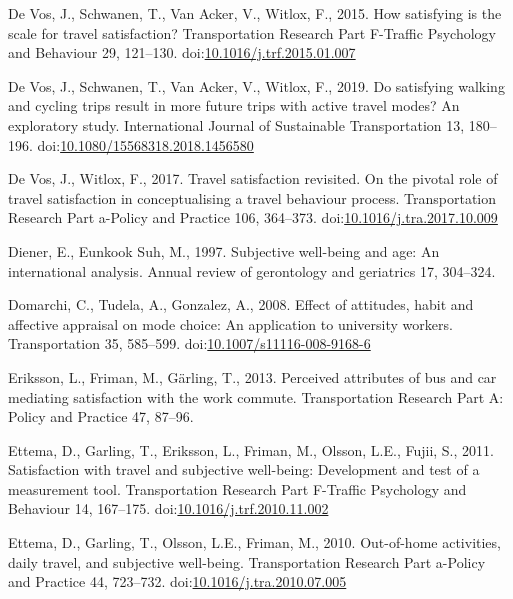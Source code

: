 \documentclass[]{elsarticle} %
\begin{document}
\leavevmode\hypertarget{ref-Devos2015satisfying}{}%
De Vos, J., Schwanen, T., Van Acker, V., Witlox, F., 2015. How
satisfying is the scale for travel satisfaction? Transportation Research
Part F-Traffic Psychology and Behaviour 29, 121--130.
doi:\href{https://doi.org/10.1016/j.trf.2015.01.007}{10.1016/j.trf.2015.01.007}

\leavevmode\hypertarget{ref-Devos2019satisfying}{}%
De Vos, J., Schwanen, T., Van Acker, V., Witlox, F., 2019. Do satisfying
walking and cycling trips result in more future trips with active travel
modes? An exploratory study. International Journal of Sustainable
Transportation 13, 180--196.
doi:\href{https://doi.org/10.1080/15568318.2018.1456580}{10.1080/15568318.2018.1456580}

\leavevmode\hypertarget{ref-Devos2017travel}{}%
De Vos, J., Witlox, F., 2017. Travel satisfaction revisited. On the
pivotal role of travel satisfaction in conceptualising a travel
behaviour process. Transportation Research Part a-Policy and Practice
106, 364--373.
doi:\href{https://doi.org/10.1016/j.tra.2017.10.009}{10.1016/j.tra.2017.10.009}

\leavevmode\hypertarget{ref-Diener1997subjective}{}%
Diener, E., Eunkook Suh, M., 1997. Subjective well-being and age: An
international analysis. Annual review of gerontology and geriatrics 17,
304--324.

\leavevmode\hypertarget{ref-Domarchi2008effect}{}%
Domarchi, C., Tudela, A., Gonzalez, A., 2008. Effect of attitudes, habit
and affective appraisal on mode choice: An application to university
workers. Transportation 35, 585--599.
doi:\href{https://doi.org/10.1007/s11116-008-9168-6}{10.1007/s11116-008-9168-6}

\leavevmode\hypertarget{ref-Eriksson2013perceived}{}%
Eriksson, L., Friman, M., Gärling, T., 2013. Perceived attributes of bus
and car mediating satisfaction with the work commute. Transportation
Research Part A: Policy and Practice 47, 87--96.

\leavevmode\hypertarget{ref-Ettema2011satisfaction}{}%
Ettema, D., Garling, T., Eriksson, L., Friman, M., Olsson, L.E., Fujii,
S., 2011. Satisfaction with travel and subjective well-being:
Development and test of a measurement tool. Transportation Research Part
F-Traffic Psychology and Behaviour 14, 167--175.
doi:\href{https://doi.org/10.1016/j.trf.2010.11.002}{10.1016/j.trf.2010.11.002}

\leavevmode\hypertarget{ref-Ettema2010out}{}%
Ettema, D., Garling, T., Olsson, L.E., Friman, M., 2010. Out-of-home
activities, daily travel, and subjective well-being. Transportation
Research Part a-Policy and Practice 44, 723--732.
doi:\href{https://doi.org/10.1016/j.tra.2010.07.005}{10.1016/j.tra.2010.07.005}
\end{document}
